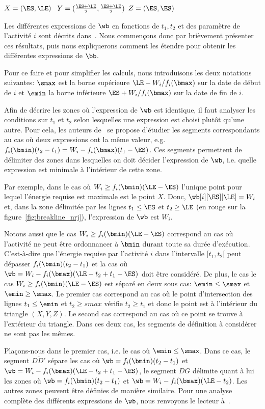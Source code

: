  $X=(\ES,\LE)$ \hfill $\ Y=(\frac{\ES+\LE}{2},\frac{\ES+\LE}{2})$
 \hfill $Z=( \ES,\ES)$

Les différentes expressions de $\wb$ en fonctions de $t_1,t_2$ et des
paramètre de l'activité $i$ sont décrits
dans~\cite{ArtiguesLopez}. Nous commençons donc par brièvement
présenter ces résultats, puis nous expliquerons comment les étendre
pour obtenir les différentes expressions de $\bb$.

Pour ce faire et pour simplifier les calculs, nous introduisons les
deux notations suivantes: $\smax$ est la borne supérieure $ \LE -
W_i/f_i(\bmax)$ sur la date de début de $i$ et $\emin$ la borne
inférieure $\ES + W_i/f_i(\bmax)$ sur la date de fin de $i$. 

Afin de décrire les zones où l'expression de $\wb$ est identique, il
faut analyser les conditions sur $t_1$ et $t_2$ selon lesquelles une
expression est choisi plutôt qu'une autre. Pour cela, les auteurs
de~\cite{ArtiguesLopez} se propose d'étudier les segments
correspondants au cas où deux expressions ont la même valeur,
e.g. $f_i(\bmin)(t_2-t_1) = W_i - f_i(\bmax) (t_1-\ES)$. Ces segments
permettent de délimiter des zones dans lesquelles on doit décider
l'expression de $\wb$, i.e. quelle expression est minimale à
l'intérieur de cette zone. 

Par exemple, dans le cas où $W_i \ge f_i(\bmin)(\LE -\ES)$ l'unique
point pour lequel l'énergie requise est maximale est le point
$X$. Donc, $\wb[i][\ES][\LE]= W_i$ et, dans la zone délimitée par les
lignes $t_1 \le \ES$ et $t_2 \ge \LE$ (en rouge sur la
figure~\ref{fig:breakline_nrj}), l'expression de $\wb$ est $W_i$. 

Notons aussi que le cas $W_i \ge f_i(\bmin)(\LE -\ES)$ correspond au
cas où l'activité ne peut être ordonnancer à $\bmin$ durant toute sa
durée d'exécution. C'est-à-dire que l'énergie requise par l'activité
$i$ dans l'intervalle $[t_1,t_2[$ peut dépasser $f_i(\bmin)(t_2-t_1)$
et la cas où $\wb= W_i - f_i(\bmax)(\LE-t_2+t_1-\ES)$ doit être
considéré. De plus, le cas le cas $W_i \ge f_i(\bmin)(\LE -\ES)$ est
séparé en deux sous cas: $\emin \le \smax$ et $\emin \ge \smax$. Le
premier cas correspond au cas où le point d'intersection des lignes
$t_1\le \emin$ et $t_2 \ge smax$ vérifie $t_2 \ge t_1$ et donc le
point est à l'intérieur du triangle $(X,Y,Z)$. Le second cas
correspond au cas où ce point se trouve à l'extérieur du
triangle. Dans ces deux cas, les segments de définition à considérer
ne sont pas les mêmes.

Plaçons-nous dans le premier cas, i.e. le cas où $\emin \le
\smax$. Dans ce cas, le segment $\overline{DD'}$ sépare les cas où
$\wb= f_i(\bmin)(t_2-t_1)$ et $\wb= W_i -
f_i(\bmax)(\LE-t_2+t_1-\ES)$, le segment $\overline{DG}$ délimite
quant à lui les zones où $\wb=f_i(\bmin)(t_2-t_1)$ et $\wb= W_i -
f_i(\bmax)(\LE-t_2)$. Les autres zones peuvent être définies de
manière similaire. Pour une analyse complète des différents
expressions de $\wb$, nous renvoyons le lecteur
à~\cite{ArtiguesLopez}. 


